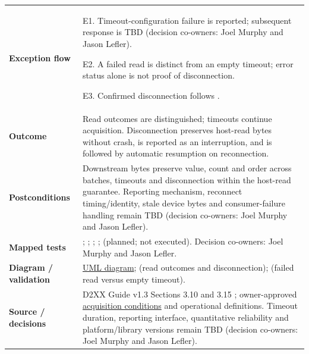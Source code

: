 \begin{tabularx}{\linewidth}{L{3.5cm}Y}
\textbf{Exception flow} & E1. Timeout-configuration failure is reported; subsequent response is TBD (decision co-owners: Joel Murphy and Jason Lefler).\par E2. A failed read is distinct from an empty timeout; error status alone is not proof of disconnection.\par E3. Confirmed disconnection follows .\\
\textbf{Outcome} & Read outcomes are distinguished; timeouts continue acquisition. Disconnection preserves host-read bytes without crash, is reported as an interruption, and is followed by automatic resumption on reconnection.\\
\textbf{Postconditions} & Downstream bytes preserve value, count and order across batches, timeouts and disconnection within the host-read guarantee. Reporting mechanism, reconnect timing/identity, stale device bytes and consumer-failure handling remain TBD (decision co-owners: Joel Murphy and Jason Lefler).\\
\textbf{Mapped tests} & ; ; ; ;  (planned; not executed). Decision co-owners: Joel Murphy and Jason Lefler.\\
\textbf{Diagram / validation} & \hyperref[Figure:UseCaseDiagram]{UML diagram};  (read outcomes and disconnection);  (failed read versus empty timeout).\\
\textbf{Source / decisions} & D2XX Guide v1.3 Sections 3.10 and 3.15 \cite{FTDI_D2XX_v1_3}; owner-approved \hyperref[Section:ProjectAcquisitionConditions]{acquisition conditions} and operational definitions. Timeout duration, reporting interface, quantitative reliability and platform/library versions remain TBD (decision co-owners: Joel Murphy and Jason Lefler).\\
\bottomrule
\end{tabularx}

